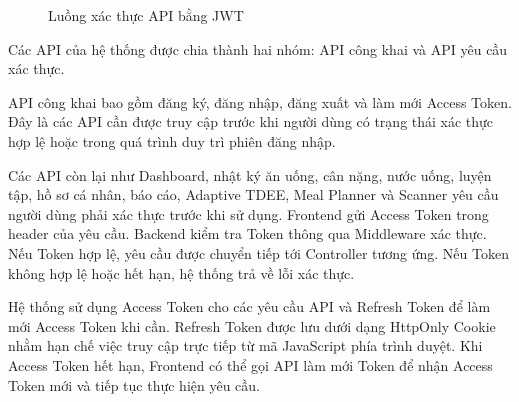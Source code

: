 \documentclass[12pt, a4paper]{report}
\begin{document}
\begin{figure}[H]
\caption{Luồng xác thực API bằng JWT}
\label{fig:jwt-auth-flow}
\end{figure}

Các API của hệ thống được chia thành hai nhóm: API công khai và API yêu cầu xác thực.

API công khai bao gồm đăng ký, đăng nhập, đăng xuất và làm mới Access Token. Đây là các API cần được truy cập trước khi người dùng có trạng thái xác thực hợp lệ hoặc trong quá trình duy trì phiên đăng nhập.

Các API còn lại như Dashboard, nhật ký ăn uống, cân nặng, nước uống, luyện tập, hồ sơ cá nhân, báo cáo, Adaptive TDEE, Meal Planner và Scanner yêu cầu người dùng phải xác thực trước khi sử dụng. Frontend gửi Access Token trong header của yêu cầu. Backend kiểm tra Token thông qua Middleware xác thực. Nếu Token hợp lệ, yêu cầu được chuyển tiếp tới Controller tương ứng. Nếu Token không hợp lệ hoặc hết hạn, hệ thống trả về lỗi xác thực.

Hệ thống sử dụng Access Token cho các yêu cầu API và Refresh Token để làm mới Access Token khi cần. Refresh Token được lưu dưới dạng HttpOnly Cookie nhằm hạn chế việc truy cập trực tiếp từ mã JavaScript phía trình duyệt. Khi Access Token hết hạn, Frontend có thể gọi API làm mới Token để nhận Access Token mới và tiếp tục thực hiện yêu cầu.
\end{document}
